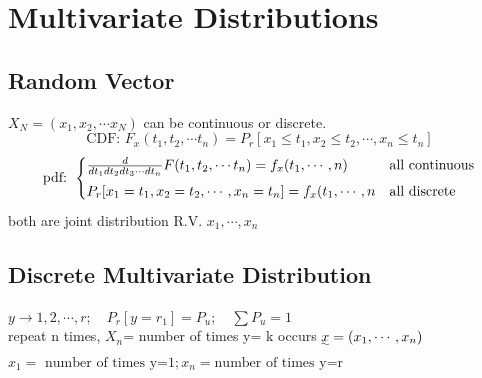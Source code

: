 \documentclass{article}
\begin{document}
\section{Multivariate Distributions}{
    \subsection{Random Vector}{

        \(X_N=(x_1, x_2, \cdots x_N)\) can be continuous or discrete.\\
        \[\text{CDF: } F_x(t_1, t_2, \cdots t_n)= P_r[x_1\leqslant t_1,x_2\leqslant t_2, \cdots, x_n\leqslant t_n]\]
        \[\text{pdf: } \begin{cases}
            \frac{d}{dt_1 dt_2 dt_3 \cdots dt_n} F(t_1, t_2, \cdots t_n)= f_{\uwave{x}}(t_1, \cdots, n) & \text{all continuous}\\
            P_r[x_1= t_1,x_2= t_2, \cdots, x_n=  t_n]=f_{x}(t_1, \cdots, n &\text{all discrete}
        \end{cases}\]
        both are joint distribution R.V. $x_1, \cdots, x_n$
    }
    \subsection{Discrete Multivariate Distribution}{
        $ y\rightarrow 1, 2, \cdots, r; \quad P_r[y=r_1]=P_u; \quad \sum P_u= 1$
        \\repeat n times, $X_n$= number of times y= k occurs 
        $\uwave{x}= (x_1, \cdots, x_n)$
        $x_1= \text{ number of times y=1}; x_n= \text{number of times y=r}$
    }
}
\end{document}
